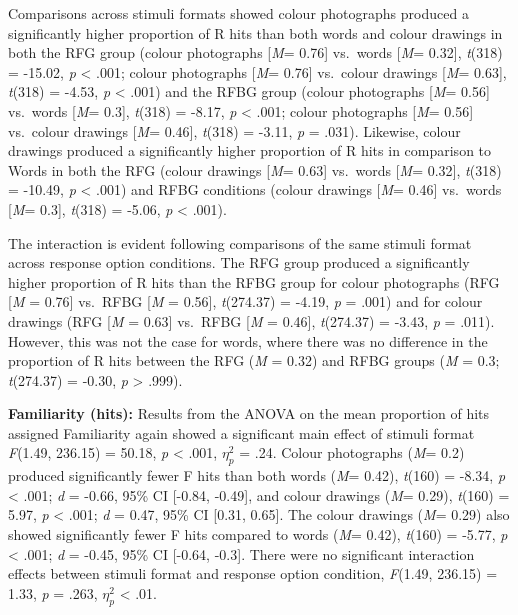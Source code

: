 \documentclass[
  11pt,
]{article}
\begin{document}
Comparisons across stimuli formats showed colour photographs produced a
significantly higher proportion of R hits than both words and colour
drawings in both the RFG group (colour photographs {[}\emph{M}= 0.76{]}
vs.~words {[}\emph{M}= 0.32{]}, \emph{t}(318) = -15.02, \emph{p}
\textless{} .001; colour photographs {[}\emph{M}= 0.76{]} vs.~colour
drawings {[}\emph{M}= 0.63{]}, \emph{t}(318) = -4.53, \emph{p}
\textless{} .001) and the RFBG group (colour photographs {[}\emph{M}=
0.56{]} vs.~words {[}\emph{M}= 0.3{]}, \emph{t}(318) = -8.17, \emph{p}
\textless{} .001; colour photographs {[}\emph{M}= 0.56{]} vs.~colour
drawings {[}\emph{M}= 0.46{]}, \emph{t}(318) = -3.11, \emph{p} = .031).
Likewise, colour drawings produced a significantly higher proportion of
R hits in comparison to Words in both the RFG (colour drawings
{[}\emph{M}= 0.63{]} vs.~words {[}\emph{M}= 0.32{]}, \emph{t}(318) =
-10.49, \emph{p} \textless{} .001) and RFBG conditions (colour drawings
{[}\emph{M}= 0.46{]} vs.~words {[}\emph{M}= 0.3{]}, \emph{t}(318) =
-5.06, \emph{p} \textless{} .001).

The interaction is evident following comparisons of the same stimuli
format across response option conditions. The RFG group produced a
significantly higher proportion of R hits than the RFBG group for colour
photographs (RFG {[}\emph{M} = 0.76{]} vs.~RFBG {[}\emph{M} = 0.56{]},
\emph{t}(274.37) = -4.19, \emph{p} = .001) and for colour drawings (RFG
{[}\emph{M} = 0.63{]} vs.~RFBG {[}\emph{M} = 0.46{]}, \emph{t}(274.37) =
-3.43, \emph{p} = .011). However, this was not the case for words, where
there was no difference in the proportion of R hits between the RFG
(\emph{M} = 0.32) and RFBG groups (\emph{M} = 0.3; \emph{t}(274.37) =
-0.30, \emph{p} \textgreater{} .999).

\textbf{Familiarity (hits):} Results from the ANOVA on the mean
proportion of hits assigned Familiarity again showed a significant main
effect of stimuli format \emph{F}(1.49, 236.15) = 50.18, \emph{p}
\textless{} .001, \(\eta^2_p\) = .24. Colour photographs (\emph{M}= 0.2)
produced significantly fewer F hits than both words (\emph{M}= 0.42),
\emph{t}(160) = -8.34, \emph{p} \textless{} .001; \emph{d} = -0.66, 95\%
CI {[}-0.84, -0.49{]}, and colour drawings (\emph{M}= 0.29),
\emph{t}(160) = 5.97, \emph{p} \textless{} .001; \emph{d} = 0.47, 95\%
CI {[}0.31, 0.65{]}. The colour drawings (\emph{M}= 0.29) also showed
significantly fewer F hits compared to words (\emph{M}= 0.42),
\emph{t}(160) = -5.77, \emph{p} \textless{} .001; \emph{d} = -0.45, 95\%
CI {[}-0.64, -0.3{]}. There were no significant interaction effects
between stimuli format and response option condition, \emph{F}(1.49,
236.15) = 1.33, \emph{p} = .263, \(\eta^2_p\) \textless{} .01.
\end{document}
